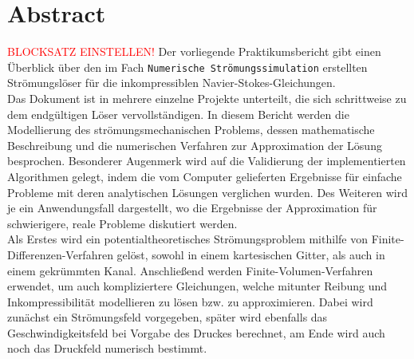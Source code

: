 \chapter*{Abstract}
\flushleft
\textcolor{red}{BLOCKSATZ EINSTELLEN!}
Der vorliegende Praktikumsbericht gibt einen \"Uberblick \"uber den im Fach \texttt{Numerische Str\"omungssimulation} erstellten Str\"omungsl\"oser f\"ur die inkompressiblen Navier-Stokes-Gleichungen. \\ [0.5cm]

Das Dokument ist in mehrere einzelne Projekte unterteilt, die sich schrittweise zu dem endg\"ultigen L\"oser vervollst\"andigen. In diesem Bericht werden die Modellierung des str\"omungsmechanischen Problems, dessen mathematische Beschreibung und die numerischen Verfahren zur Approximation der L\"osung besprochen. Besonderer Augenmerk wird auf  die Validierung der implementierten Algorithmen gelegt, indem die vom Computer gelieferten Ergebnisse f\"ur einfache Probleme mit deren analytischen L\"osungen verglichen wurden. Des Weiteren wird je ein Anwendungsfall dargestellt, wo die Ergebnisse der Approximation f\"ur schwierigere, reale Probleme diskutiert werden. \\[1cm]

Als Erstes wird ein potentialtheoretisches Str\"omungsproblem mithilfe von Finite-Differenzen-Verfahren gel\"ost, sowohl in einem kartesischen Gitter, als auch in einem gekr\"ummten Kanal. Anschlie\ss{}end werden Finite-Volumen-Verfahren erwendet, um auch kompliziertere Gleichungen, welche mitunter Reibung und Inkompressibilit\"at modellieren zu l\"osen bzw. zu approximieren. Dabei wird zun\"achst ein Str\"omungsfeld vorgegeben, sp\"ater wird ebenfalls das Geschwindigkeitsfeld bei Vorgabe des Druckes berechnet, am Ende wird auch noch das Druckfeld numerisch bestimmt.
